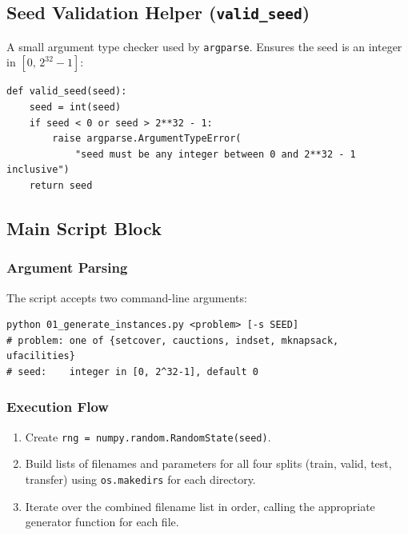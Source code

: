 \subsection{Seed Validation Helper (\texttt{valid\_seed})}

A small argument type checker used by \texttt{argparse}. Ensures the seed is an integer in $[0,\, 2^{32}-1]$:

\begin{lstlisting}
def valid_seed(seed):
    seed = int(seed)
    if seed < 0 or seed > 2**32 - 1:
        raise argparse.ArgumentTypeError(
            "seed must be any integer between 0 and 2**32 - 1 inclusive")
    return seed
\end{lstlisting}

\subsection{Main Script Block}

\subsubsection{Argument Parsing}

The script accepts two command-line arguments:

\begin{lstlisting}
python 01_generate_instances.py <problem> [-s SEED]
# problem: one of {setcover, cauctions, indset, mknapsack, ufacilities}
# seed:    integer in [0, 2^32-1], default 0
\end{lstlisting}

\subsubsection{Execution Flow}

\begin{enumerate}
    \item Create \texttt{rng = numpy.random.RandomState(seed)}.
    \item Build lists of filenames and parameters for all four splits (train, valid, test, transfer) using \texttt{os.makedirs} for each directory.
    \item Iterate over the combined filename list in order, calling the appropriate generator function for each file.
\end{enumerate}


